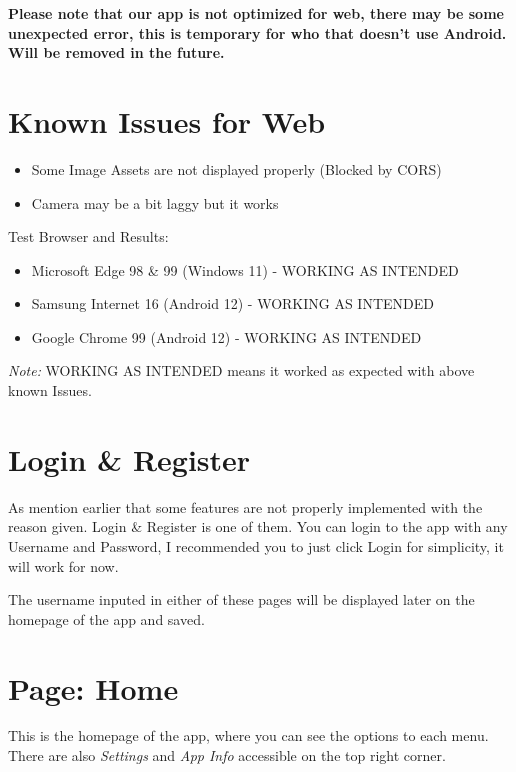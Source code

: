 \documentclass[a4paper,12pt]{article}
\begin{document}
\textbf{
Please note that our app is not optimized for web, there may be some unexpected error, 
this is temporary for who that doesn't use Android. Will be removed in the future.}

\section*{Known Issues for Web}
\begin{itemize}
    \item Some Image Assets are not displayed properly (Blocked by CORS)
    \item Camera may be a bit laggy but it works
\end{itemize}

\noindent
Test Browser and Results:
\begin{itemize}
    \item Microsoft Edge 98 \& 99 (Windows 11) - WORKING AS INTENDED
    \item Samsung Internet 16 (Android 12) - WORKING AS INTENDED
    \item Google Chrome 99  (Android 12) - WORKING AS INTENDED
\end{itemize}

\noindent
\textit{Note:} WORKING AS INTENDED means it worked as expected with above known Issues.

\pagebreak
\section{Login \& Register}


As mention earlier that some features are not properly implemented with the reason given.
Login \& Register is one of them. You can login to the app with any Username and
Password, I recommended you to just click Login for simplicity, it will work for now.

The username inputed in either of these pages will be displayed later on
the homepage of the app and saved.

\pagebreak
\section{Page: Home}


This is the homepage of the app, where you can see the options to each menu.
There are also \textit{Settings} and \textit{App Info} accessible on the top right corner.
\end{document}
